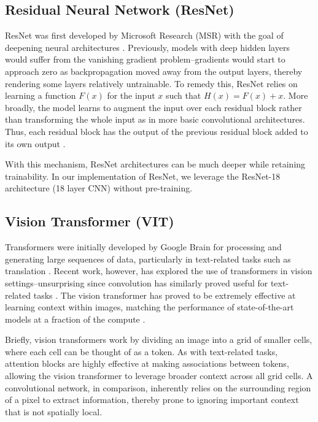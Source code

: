 \documentclass[conference]{IEEEtran}
\begin{document}
\subsection{Residual Neural Network (ResNet)}
ResNet was first developed by Microsoft Research (MSR) with the goal of deepening neural architectures \cite{resnet}. Previously, models with deep hidden layers would suffer from the vanishing gradient problem--gradients would start to approach zero as backpropagation moved away from the output layers, thereby rendering some layers relatively untrainable. To remedy this, ResNet relies on learning a function $F(x)$ for the input $x$ such that $H(x) = F(x) + x$. More broadly, the model learns to augment the input over each residual block rather than transforming the whole input as in more basic convolutional architectures. Thus, each residual block has the output of the previous residual block added to its own output \cite{resnet}.

With this mechanism, ResNet architectures can be much deeper while retaining trainability. In our implementation of ResNet, we leverage the ResNet-18 architecture (18 layer CNN) without pre-training.

\subsection{Vision Transformer (VIT)}
Transformers were initially developed by Google Brain for processing and generating large sequences of data, particularly in text-related tasks such as translation \cite{transformer}. Recent work, however, has explored the use of transformers in vision settings--unsurprising since convolution has similarly proved useful for text-related tasks \cite{VIT} \cite{transformer}. The vision transformer has proved to be extremely effective at learning context within images, matching the performance of state-of-the-art models at a fraction of the compute \cite{VIT}.

Briefly, vision transformers work by dividing an image into a grid of smaller cells, where each cell can be thought of as a token. As with text-related tasks, attention blocks are highly effective at making associations between tokens, allowing the vision transformer to leverage broader context across all grid cells. A convolutional network, in comparison, inherently relies on the surrounding region of a pixel to extract information, thereby prone to ignoring important context that is not spatially local.
\end{document}
